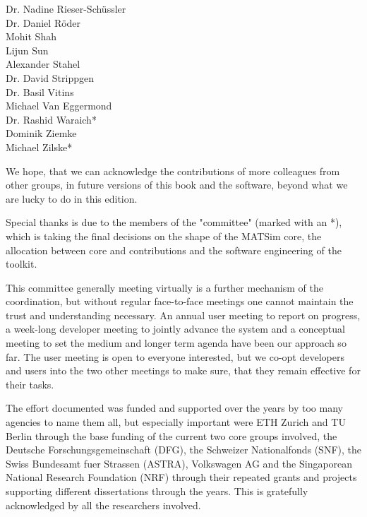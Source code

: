 \begin{multicols}{3}
Dr. Nadine Rieser-Schüssler \\
Dr. Daniel Röder \\
Mohit Shah \\
Lijun Sun \\
Alexander Stahel \\
Dr. David Strippgen \\
Dr. Basil Vitins \\
Michael Van Eggermond \\
Dr. Rashid Waraich\mbox{*} \\
Dominik Ziemke \\
Michael Zilske\mbox{*} \\
\end{multicols}

 
We hope, that we can acknowledge the contributions of more colleagues from other groups, in future versions of this book and the software, beyond what we are lucky to do in this edition.   

Special thanks is due to the members of the "committee" (marked with an \mbox{*}), which is taking the final decisions on the shape of the MATSim core, the allocation between core and contributions and the software engineering of the toolkit.

This committee generally meeting virtually is a further mechanism of the coordination, but without regular face-to-face meetings one cannot maintain the trust and understanding necessary. An annual user meeting to report on progress, a week-long developer meeting to jointly advance the system and a conceptual meeting to set the medium and longer term agenda have been our approach so far. The user meeting is open to everyone interested, but we co-opt developers and users into the two other meetings to make sure, that they remain effective for their tasks. 

The effort documented was funded and supported over the years by too many agencies to name them all, but especially important were ETH Zurich and TU Berlin through the base funding of the current two core groups involved, the Deutsche Forschungsgemeinschaft (DFG), the Schweizer Nationalfonds (SNF), the Swiss Bundesamt fuer Strassen (ASTRA), Volkswagen AG and the Singaporean National Research Foundation (NRF) through their repeated grants and projects supporting different dissertations through the years. This is gratefully acknowledged by all the researchers involved. 

